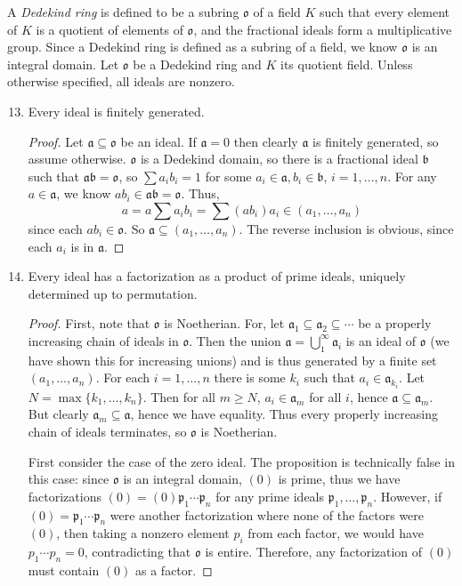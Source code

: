 \documentclass[10pt]{article}
\newcommand{\p}{\mathfrak{p}}
\renewcommand{\a}{\mathfrak{a}}
\renewcommand{\b}{\mathfrak{b}}
\renewcommand{\o}{\mathfrak{o}}
\begin{document}
\noindent A \emph{Dedekind ring} is defined to be a subring $\o$ of a field $K$ such that every element of $K$ is a quotient of elements of $\o$, and the fractional ideals form a multiplicative group.  Since a Dedekind ring is defined as a subring of a field, we know $\o$ is an integral domain.  Let $\o$ be a Dedekind ring and $K$ its quotient field.  Unless otherwise specified, all ideals are nonzero.

\begin{enumerate}
\setcounter{enumi}{12}
\item Every ideal is finitely generated.

\begin{proof}
Let $\a \subseteq \o$ be an ideal.  If $\a = 0$ then clearly $\a$ is finitely generated, so assume otherwise.  $\o$ is a Dedekind domain, so there is a fractional ideal $\b$ such that $\a\b = \o$, so $\sum a_i b_i = 1$ for some $a_i \in \a, b_i \in \b$, $i = 1, \dots , n$.  For any $a \in \a$, we know $a b_i \in \a\b = \o$.  Thus,
$$
a = a \sum a_i b_i = \sum (ab_i) a_i \in (a_1, \dots , a_n)
$$
since each $ab_i \in \o$.  So $\a \subseteq (a_1, \dots , a_n)$.  The reverse inclusion is obvious, since each $a_i$ is in $\a$.
\end{proof}

\item Every ideal has a factorization as a product of prime ideals, uniquely determined up to permutation.

\begin{proof}
First, note that $\o$ is Noetherian.  For, let $\a_1 \subseteq \a_2 \subseteq \cdots$ be a properly increasing chain of ideals in $\o$.  Then the union $\a = \bigcup_1^\infty \a_i$ is an ideal of $\o$ (we have shown this for increasing unions) and is thus generated by a finite set $(a_1, \dots , a_n)$.  For each $i=1,\dots,n$ there is some $k_i$ such that $a_i \in \a_{k_i}$.  Let $N = \max \{k_1, \dots , k_n\}$.  Then for all $m \geq N$, $a_i \in \a_m$ for all $i$, hence $\a \subseteq \a_m$.  But clearly $\a_m \subseteq \a$, hence we have equality.  Thus every properly increasing chain of ideals terminates, so $\o$ is Noetherian.

First consider the case of the zero ideal.  The proposition is technically false in this case: since $\o$ is an integral domain, $(0)$ is prime, thus we have factorizations $(0) = (0)\p_1 \cdots \p_n$ for any prime ideals $\p_1, \dots, \p_n$.  However, if $(0) = \p_1 \cdots \p_n$ were another factorization where none of the factors were $(0)$, then taking a nonzero element $p_i$ from each factor, we would have $p_1 \cdots p_n = 0$, contradicting that $\o$ is entire.  Therefore, any factorization of $(0)$ must contain $(0)$ as a factor.


\end{proof}
\end{enumerate}
\end{document}
